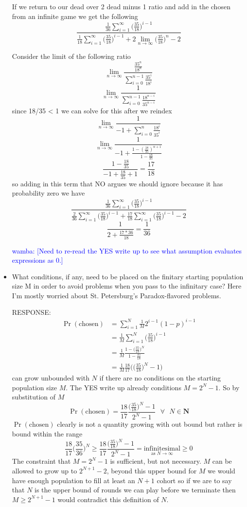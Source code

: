 \documentclass[article,twocolumn]{memoir}
\newcommand{\wamba} [1]{\ifnum\Chatty=1 \textcolor{blue}{wamba:  [#1]} \fi}
\begin{document}
\begin{itemize}
{        If we return to our dead over 2 dead minus 1 ratio and add in the chosen from an infinite game we get the following
        $$\frac{\frac{1}{36}\sum_{i=1}^\infty \bigg(\frac{35}{18}\bigg)^{i-1}}{\frac{1}{18}\sum_{i=1}^\infty \bigg(\frac{35}{18}\bigg)^{i-1}+2\lim_{n\to\infty}\bigg(\frac{35}{18}\bigg)^n -2}$$

        
        Consider the limit of the following ratio
        $$\lim_{n\to\infty}\frac{\frac{35^n}{18^n}}{\sum_{i=0}^{n-1}\frac{35^i}{18^i}}$$
        $$\lim_{n\to\infty}\frac{1}{\sum_{i=0}^{n-1}\frac{18^{n-i}}{35^{n-i}}}$$
        since 18/35 < 1 we can solve for this after we reindex
        $$\lim_{n\to\infty}\frac{1}{-1+\sum_{i=0}^{n}\frac{18^{i}}{35^{i}}}$$
        $$\lim_{n\to\infty}\frac{1}{-1+\frac{1-(\frac{18}{35})^{n+1}}{1-\frac{18}{35}}}$$
        $$\frac{1-\frac{18}{35}}{-1+\frac{18}{35}+1} = \frac{17}{18}$$
        so adding in this term that NO argues we should ignore because it has probability zero we have
        $$\frac{\frac{1}{36}\sum_{i=1}^\infty \bigg(\frac{35}{18}\bigg)^{i-1}}{\frac{2}{36}\sum_{i=1}^\infty \bigg(\frac{35}{18}\bigg)^{i-1}+\frac{17}{18}\sum_{i=1}^\infty \bigg(\frac{35}{18}\bigg)^{i-1}-2}$$
        $$\frac{1}{2+\frac{17*36}{18}}=\frac{1}{36}$$
    }
    \wamba{Need to re-read the YES write up to see what assumption evaluates expressions as 0.}
\item What conditions, if any, need to be placed on the finitary starting population size M in order to avoid problems when you pass to the infinitary case? Here I’m mostly worried about St. Petersburg’s Paradox-flavored problems.

   {\color{violet}
        RESPONSE:
        \begin{align*}
            \Pr(\text{chosen}) &= \sum_{i=1}^{N} \tfrac{1}{M} 2^{i-1}(1-p)^{i-1}\\
            &= \frac{1}{M} \sum_{i=1}^{N} \bigg(\frac{35}{18}\bigg)^{i-1}\\
            &= \frac{1}{M} \frac{1-\bigg(\frac{35}{18}\bigg)^{N}}{1-\frac{35}{18}}\\
            &= \frac{1}{M} \frac{18}{17}\bigg(\big(\frac{35}{18}\big)^N-1\bigg)
        \end{align*}
        can grow unbounded with $N$ if there are no conditions on the starting population size $M$.  The YES write up already conditions $M = 2^N-1$.  So by substitution of $M$
        $$\Pr(\text{chosen})= \frac{18}{17}\frac{\big(\frac{35}{18}\big)^N-1}{2^N-1} \text{  }\forall\text{  }N \in \mathbf{N}$$
        $\Pr(\text{chosen})$ clearly is not a quantity growing with out bound but rather is bound within the range 
        $$\frac{18}{17}\bigg(\frac{35}{36}\bigg)^N\geq \frac{18}{17}\frac{\big(\frac{35}{18}\big)^N-1}{2^N-1}  = \underset{\text{as }N\to\infty }{\text{infinitesimal}} \geq 0$$
        The constraint that $M = 2^N-1$ is sufficient, but not necessary. $M$ can be allowed to grow up to $2^{N+1}-2$, beyond this upper bound for $M$ we would have enough population to fill at least an $N+1$ cohort so if we are to say that $N$ is the upper bound of rounds we can play before we terminate then $M\geq 2^{N+1}-1$ would contradict this definition of $N$.

}
\end{itemize}
\end{document}
